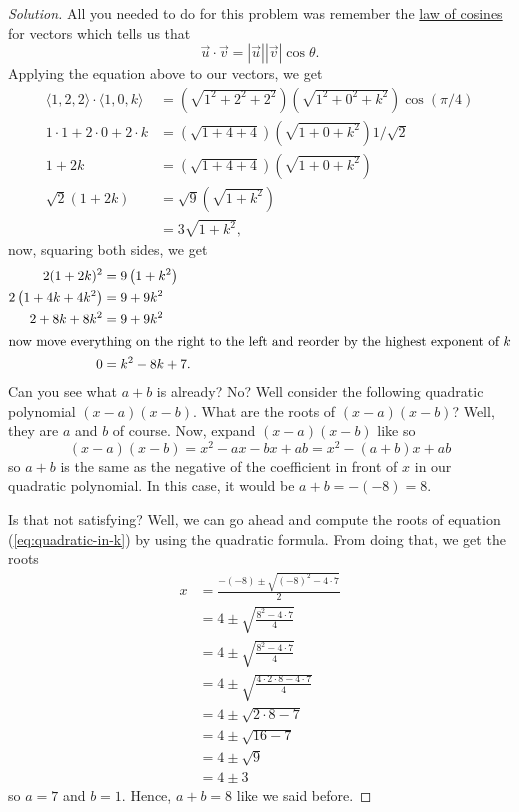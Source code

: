 \documentclass{article}
\theoremstyle{plain}
\theoremstyle{definition}
\theoremstyle{remark}
\begin{document}
\begin{proof}[Solution]
All you needed to do for this problem was remember the
\href{https://en.wikipedia.org/wiki/Law_of_cosines#Vector_formulation}{law
  of cosines} for vectors which tells us that
\begin{equation}
  \label{eq:law-of-cosines}
\vec u\cdot\vec v=\left|\vec u\right|\left|\vec v\right|\cos\theta.
\end{equation}
Applying the equation above to our vectors, we get
\begingroup
\allowdisplaybreaks
\begin{align*}
\langle 1,2,2\rangle\cdot\langle 1,0,k\rangle
&=\left(\sqrt{1^2+2^2+2^2}\right)
\left(\sqrt{1^2+0^2+k^2}\right)\cos(\pi/4)\\
1\cdot 1+2\cdot 0+2\cdot k&=\left(\sqrt{1+4+4}\right)
\left(\sqrt{1+0+k^2}\right)1/\sqrt{2}\\
1+2k&=\left(\sqrt{1+4+4}\right)
\left(\sqrt{1+0+k^2}\right)\\
\sqrt{2}(1+2k)&=\sqrt{9}
\left(\sqrt{1+k^2}\right)\\
&=3\sqrt{1+k^2},
\end{align*}
\endgroup
now, squaring both sides, we get
\begingroup
\allowdisplaybreaks
\begin{align}
\label{eq:quadratic-in-k}
2(1+2k)^2&=9\left(1+k^2\right)\nonumber\\
2\left(1+4k+4k^2\right)&=9+9k^2\nonumber\\
2+8k+8k^2&=9+9k^2\nonumber\\
\intertext{now move everything on the right to the left and reorder by
  the highest exponent of $k$}
0&=k^2-8k+7.
\end{align}
\endgroup
Can you see what $a+b$ is already? No? Well consider the following
quadratic polynomial $(x-a)(x-b)$. What are the roots of $(x-a)(x-b)$?
Well, they are $a$ and $b$ of course. Now, expand $(x-a)(x-b)$ like so
\[
(x-a)(x-b)=x^2-ax-bx+ab=x^2-(a+b)x+ab
\]
so $a+b$ is the same as the negative of the coefficient in front of $x$ in
our quadratic polynomial. In this case, it would be $\boxed{a+b=-(-8)=8}$.

Is that not satisfying? Well, we can go ahead and compute the roots of
equation (\ref{eq:quadratic-in-k}) by using the quadratic formula. From
doing that, we get the roots
\begingroup
\allowdisplaybreaks
\begin{align*}
x&=\frac{-(-8)\pm\sqrt{(-8)^2-4\cdot 7}}{2}\\
&=4\pm\sqrt{\frac{8^2-4\cdot 7}{4}}\\
&=4\pm\sqrt{\frac{8^2-4\cdot 7}{4}}\\
&=4\pm\sqrt{\frac{4\cdot 2\cdot 8-4\cdot 7}{4}}\\
&=4\pm\sqrt{2\cdot 8-7}\\
&=4\pm\sqrt{16-7}\\
&=4\pm\sqrt{9}\\
&=4\pm 3
\end{align*}
\endgroup
so $a=7$ and $b=1$. Hence, $\boxed{a+b=8}$ like we said before.
\end{proof}
\end{document}
